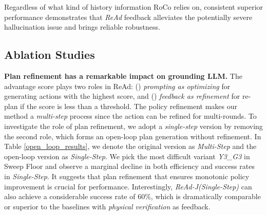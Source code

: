 \documentclass[11pt]{article}
\theoremstyle{plain}
\theoremstyle{remark}
\begin{document}
Regardless of what kind of history information RoCo relies on, consistent superior performance demonstrates that \emph{ReAd} feedback alleviates the potentially severe hallucination issue and brings reliable robustness.

\vspace{-0.5em}
\subsection{Ablation Studies}\label{section:5-3}
\textbf{Plan refinement has a remarkable impact on grounding LLM.}
The advantage score plays two roles in ReAd: () \emph{prompting as optimizing} for generating actions with the highest score, and () \emph{feedback as refinement} for re-plan if the score is less than a threshold. The policy refinement makes our method a \emph{multi-step} process since the action can be refined for multi-rounds. To investigate the role of plan refinement, we adopt a \emph{single-step} version by removing the second role, which forms an open-loop plan generation without refinement. In Table \ref{open_loop_results}, we denote the original version as \emph{Multi-Step} and the open-loop version as \emph{Single-Step}. We pick the most difficult variant \emph{Y3\_G3} in Sweep Floor and observe a marginal decline in both efficiency and success rates in \emph{Single-Step}.
It suggests that plan refinement that ensures monotonic policy improvement is crucial for performance. 
Interestingly, \emph{ReAd-J(Single-Step)} can also achieve a considerable success rate of 60\%, which is dramatically comparable or superior to the baselines with \emph{physical verification} as feedback.
\end{document}
